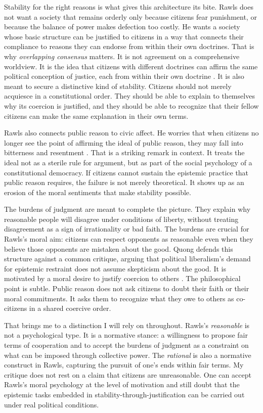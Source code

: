\documentclass[12pt]{article}
\begin{document}
Stability for the right reasons is what gives this architecture its bite. Rawls does not want a society that remains orderly only because citizens fear punishment, or because the balance of power makes defection too costly. He wants a society whose basic structure can be justified to citizens in a way that connects their compliance to reasons they can endorse from within their own doctrines. That is why \emph{overlapping consensus} matters. It is not agreement on a comprehensive worldview. It is the idea that citizens with different doctrines can affirm the same political conception of justice, each from within their own doctrine \parencite[p.~8]{rawls1987overlapping}. It is also meant to secure a distinctive kind of stability. Citizens should not merely acquiesce in a constitutional order. They should be able to explain to themselves why its coercion is justified, and they should be able to recognize that their fellow citizens can make the same explanation in their own terms.

Rawls also connects public reason to civic affect. He worries that when citizens no longer see the point of affirming the ideal of public reason, they may fall into bitterness and resentment \parencite[p.~485]{rawls2005political}. That is a striking remark in context. It treats the ideal not as a sterile rule for argument, but as part of the social psychology of a constitutional democracy. If citizens cannot sustain the epistemic practice that public reason requires, the failure is not merely theoretical. It shows up as an erosion of the moral sentiments that make stability possible.

The burdens of judgment are meant to complete the picture. They explain why reasonable people will disagree under conditions of liberty, without treating disagreement as a sign of irrationality or bad faith. The burdens are crucial for Rawls's moral aim: citizens can respect opponents as reasonable even when they believe those opponents are mistaken about the good. Quong defends this structure against a common critique, arguing that political liberalism's demand for epistemic restraint does not assume skepticism about the good. It is motivated by a moral desire to justify coercion to others \parencite[p.~322]{quong2007without}. The philosophical point is subtle. Public reason does not ask citizens to doubt their faith or their moral commitments. It asks them to recognize what they owe to others as co-citizens in a shared coercive order.

That brings me to a distinction I will rely on throughout. Rawls's \emph{reasonable} is not a psychological type. It is a normative stance: a willingness to propose fair terms of cooperation and to accept the burdens of judgment as a constraint on what can be imposed through collective power. The \emph{rational} is also a normative construct in Rawls, capturing the pursuit of one's ends within fair terms. My critique does not rest on a claim that citizens are unreasonable. One can accept Rawls's moral psychology at the level of motivation and still doubt that the epistemic tasks embedded in stability-through-justification can be carried out under real political conditions.
\end{document}
